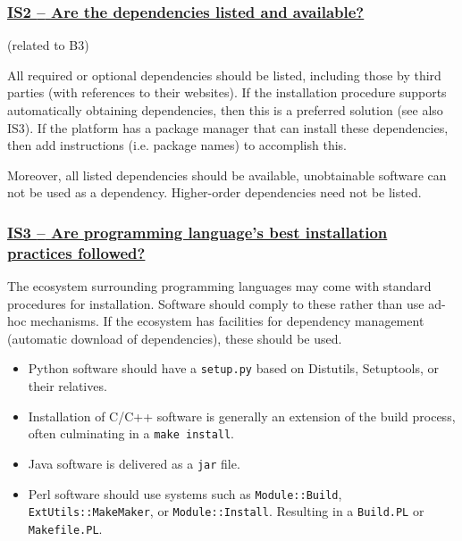 \documentclass[a4paper,11pt]{article}
\newcommand{\criterion}[1]{\subsubsection*{\underline{#1}}}
\begin{document}
\newcommand{\isTwoID}{IS2}
\newcommand{\isTwoText}{Are the dependencies listed and available?}
\criterion{\isTwoID{ }--{ }\isTwoText}\label{id:is2} 
(related to B3)

All required or optional dependencies should be listed, including those by
third parties (with references to their websites). If the installation
procedure supports automatically obtaining dependencies, then this is a
preferred solution (see also IS3). If the platform has a package manager that
can install these dependencies, then add instructions (i.e. package names) to
accomplish this.

Moreover, all listed dependencies should be available, unobtainable software
can not be used as a dependency. Higher-order dependencies need not be listed.
%
%

\newcommand{\isThreeID}{IS3}
\newcommand{\isThreeText}{Are programming language's best installation practices followed?}
\criterion{\isThreeID{ }--{ }\isThreeText}\label{id:is3} 

The ecosystem surrounding programming languages may come with standard
procedures for installation. Software should comply to these rather than use
ad-hoc mechanisms. If the ecosystem has facilities for dependency management
(automatic download of dependencies), these should be used.

\begin{itemize}
 \item Python software should have a \texttt{setup.py} based on Distutils,
     Setuptools, or their relatives.
 \item Installation of C/C++ software is generally an extension of the build
     process, often culminating in a \texttt{make install}.
 \item Java software is delivered as a \texttt{jar} file.
 \item Perl software should use systems such as \texttt{Module::Build},
     \texttt{ExtUtils::MakeMaker}, or \texttt{Module::Install}. Resulting in a
     \texttt{Build.PL} or \texttt{Makefile.PL}.
\end{itemize}
\end{document}
